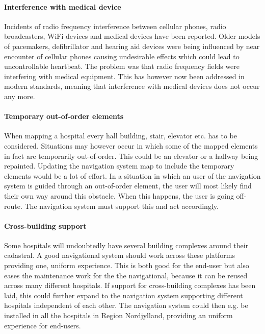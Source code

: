 \paragraph{Interference with medical device}

Incidents of radio frequency interference between cellular phones, radio broadcasters, WiFi devices and medical devices have been reported. Older models of pacemakers, defibrillator and hearing aid devices were being influenced by near encounter of cellular phones causing undesirable effects which could lead to uncontrollable heartbeat. 
The problem was that radio frequency fields were interfering with medical equipment. This has however now been addressed in modern standards, meaning that interference with medical devices does not occur any more. \cite{Man1998,Case}

\paragraph{Temporary out-of-order elements}

When mapping a hospital every hall building, stair, elevator etc. has to be considered. Situations may however occur in which some of the mapped elements in fact are temporarily out-of-order. This could be an elevator or a hallway being repainted. Updating the navigation system map to include the temporary elements would be a lot of effort. In a situation in which an user of the navigation system is guided through an out-of-order element, the user will most likely find their own way around this obstacle. When this happens, the user is going off-route. The navigation system must support this and act accordingly.

\paragraph{Cross-building support}

Some hospitals will undoubtedly have several building complexes around their cadastral. A good navigational system should work across these platforms providing one, uniform experience. This is both good for the end-user but also eases the maintenance work for the the navigational, because it can be reused across many different hospitals. If support for cross-building complexes has been laid, this could further expand to the navigation system supporting different hospitals independent of each other. The navigation system could then e.g. be installed in all the hospitals in Region Nordjylland, providing an uniform experience for end-users.

